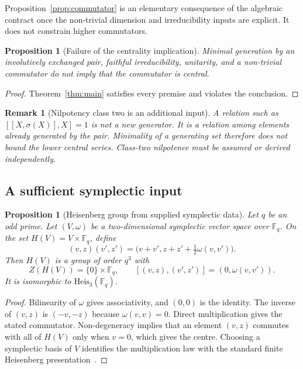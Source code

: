 \documentclass[11pt,a4paper]{article}
\newtheorem{proposition}[theorem]{Proposition}
\newtheorem{remark}[theorem]{Remark}
\newcommand{\Heis}{\mathrm{Heis}_3}
\begin{document}
    Proposition~\ref{prop:commutator} is an elementary consequence of the
    algebraic contract once the non-trivial dimension and irreducibility inputs
    are explicit.
    It does not constrain higher commutators.

    \begin{proposition}[Failure of the centrality implication]
      \label{prop:central}
      Minimal generation by an involutively exchanged pair, faithful
      irreducibility, unitarity, and a non-trivial commutator do not imply that
      the commutator is central.
    \end{proposition}

    \begin{proof}
      Theorem~\ref{thm:main} satisfies every premise and violates the conclusion.
    \end{proof}

    \begin{remark}[Nilpotency class two is an additional input]
      \label{rem:nilpotency}
      A relation such as $[[X,\sigma(X)],X]=1$ is not a new generator.
      It is a relation among elements already generated by the pair.
      Minimality of a generating set therefore does not bound the lower central
      series.
      Class-two nilpotence must be assumed or derived independently.
    \end{remark}

  \subsection{A sufficient symplectic input}

    \begin{proposition}[Heisenberg group from supplied symplectic data]
      \label{prop:heisenberg-algebra}
      Let $q$ be an odd prime.
      Let $(V,\omega)$ be a two-dimensional symplectic vector space over
      $\mathbb{F}_q$.
      On the set $H(V)=V\times\mathbb{F}_q$, define
      \begin{equation}
        (v,z)(v',z')
        =\bigl(v+v',z+z'+\tfrac12\omega(v,v')\bigr).
        \label{eq:heisenberg-presentation}
      \end{equation}
      Then $H(V)$ is a group of order $q^3$ with
      \[
        Z(H(V))=\{0\}\times\mathbb{F}_q,\qquad
        [(v,z),(v',z')]=(0,\omega(v,v')).
      \]
      It is isomorphic to $\Heis(\mathbb{F}_q)$.
    \end{proposition}

    \begin{proof}
      Bilinearity of $\omega$ gives associativity, and $(0,0)$ is the identity.
      The inverse of $(v,z)$ is $(-v,-z)$ because $\omega(v,v)=0$.
      Direct multiplication gives the stated commutator.
      Non-degeneracy implies that an element $(v,z)$ commutes with all of $H(V)$
      only when $v=0$, which gives the centre.
      Choosing a symplectic basis of $V$ identifies the multiplication law with
      the standard finite Heisenberg presentation~\cite{GurevichHadani2009}.
    \end{proof}
\end{document}
